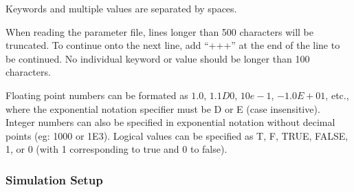 \documentclass[12pt]{article}
\begin{document}
Keywords and multiple values are separated by spaces.

When reading the parameter file, lines longer than 500 characters will be truncated. To continue onto the next line, add ``+++'' at the end of the line to be continued.
No individual keyword or  value should be longer than 100 characters.

Floating point numbers can be formated as $1.0$, $1.1D0$, $10e-1$, $-1.0E+01$, etc., where the exponential notation specifier must be D or E (case insensitive). Integer numbers can also be specified in exponential notation without decimal points (eg: 1000 or 1E3). Logical values can be specified as T, F, TRUE, FALSE, 1, or 0 (with 1 corresponding to true and 0 to false).


\subsubsection*{Simulation Setup}
\end{document}
